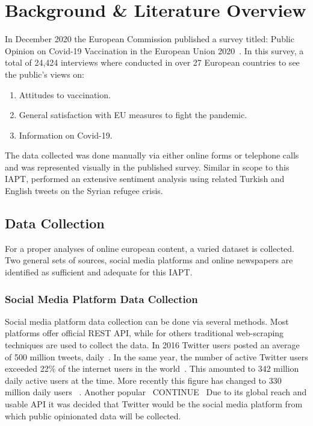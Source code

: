 \chapter{Background \& Literature Overview}

In December 2020 the European Commission published a survey titled: Public Opinion on Covid-19 Vaccination in the European Union 2020~\citep{eupublicopinion}.
In this survey, a total of 24,424 interviews where conducted in over 27 European countries to see the public's views on:

\begin{enumerate}
  \item Attitudes to vaccination.
  \item General satisfaction with EU measures to fight the pandemic.
  \item Information on Covid-19.
\end{enumerate}
\noindent The data collected was done manually via either online forms or telephone calls and was represented visually in the published survey.
Similar in scope to this \ac{IAPT}, \citet{ztrk2018} performed an extensive sentiment analysis using related Turkish and English tweets on the Syrian refugee crisis.


\section{Data Collection}

For a proper analyses of online european content, a varied dataset is collected.
Two general sets of sources, social media platforms and online newspapers are identified as sufficient and adequate for this \ac{IAPT}.

\subsection{Social Media Platform Data Collection}

Social media platform data collection can be done via several methods.
Most platforms offer official \ac{REST} \ac{API}, while for others traditional web-scraping techniques are used to collect the data.
In 2016 Twitter users posted an average of 500 million tweets, daily~\citep{Crannell2016}.
In the same year, the number of active Twitter users exceeded 22\% of the internet users in the world~\citep{Kayser2016}.
This amounted to 342 million daily active users at the time.
More recently this figure has changed to 330 million daily users ~\citep{tankovska_2021}.
Another popular ~CONTINUE~
Due to its global reach and usable \ac{API} it was decided that Twitter would be the social media platform from which public opinionated data will be collected.

